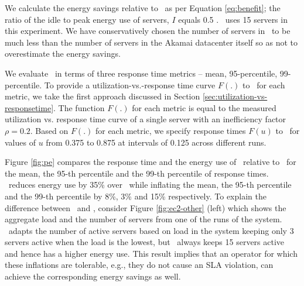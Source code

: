%
We calculate the energy savings relative to \peakS\ as per Equation \ref{eq:benefit}; the ratio of the idle to peak energy use of servers, $I$ equals 0.5 \cite{barroso2007case}. \peakS\ uses 15 servers in this experiment. We have conservatively chosen the number of servers in \peakS\ to be much less than the number of servers in the Akamai datacenter itself so as not to overestimate the energy savings. 



We evaluate \shrink\ in terms of three response time metrics --  mean, 95-percentile, 99-percentile. 
To provide a utilization-vs.-response time curve $F(.)$ to \shrink\ for each metric, we take the first approach discussed in Section \ref{sec:utilization-vs-responsetime}. The function $F(.)$ for each metric is equal to the measured utilization vs. response time curve of a single server with an inefficiency factor $\rho = 0.2$.  Based on $F(.)$ for each metric, we specify response times $F(u)$ to \shrink\ for values of $u$ from 0.375 to 0.875 at intervals of 0.125 across different runs. 



Figure \ref{fig:pe} compares the response time and the energy use of \shrink\ relative to \peakS\ for the mean, the 95-th percentile and the 99-th percentile of response times. \shrink\ reduces energy use by 35\% over \peakS\ while inflating the mean, the 95-th percentile and the 99-th percentile by 8\%, 3\% and 15\% respectively. 
To explain the difference between \peakS\ and \shrink, consider Figure \ref{fig:ec2-other} (left)  which shows the aggregate load and the number of servers from one of the runs of the system. \shrink\  adapts the number of active servers based on load in the system keeping only 3 servers active when the load is the lowest, but \peakS\ always keeps 15 servers active and hence has a higher energy use. This result implies that an operator for which these inflations are tolerable, e.g., they do not cause an SLA violation, can achieve the corresponding energy savings as well. 








